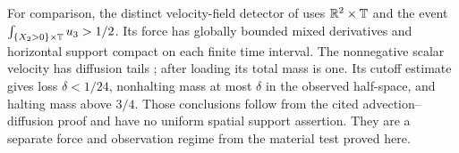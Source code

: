 \begin{remark}
For comparison, the distinct velocity-field detector of
\cite[Theorem~1.1(2) and Section~5]{OpenAI379EulerianC} uses
$\mathbb R^2\times\mathbb T$ and the event
$\int_{\{X_2>0\}\times\mathbb T}u_3>1/2$. Its force has globally bounded
mixed derivatives and horizontal support compact on each finite time
interval. The nonnegative scalar velocity has diffusion tails \cite{Nash1958,Aronson1968}; after
loading its total mass is one. Its cutoff estimate gives loss
$\delta<1/24$, nonhalting mass at most $\delta$ in the observed half-space,
and halting mass above $3/4$. Those conclusions follow from the cited
advection--diffusion proof and have no uniform spatial support assertion.
They are a separate force and observation regime from the material test
proved here.
\end{remark}
